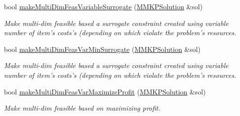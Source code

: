 \begin{DoxyCompactItemize}
bool \hyperlink{class_m_m_k_p___meta_heuristic_ab46e7fb53a209807fb2da72c52c08802}{make\+Multi\+Dim\+Feas\+Variable\+Surrogate} (\hyperlink{class_m_m_k_p_solution}{M\+M\+K\+P\+Solution} \&sol)
\begin{DoxyCompactList}\small\item\em Make multi-\/dim feasible based a surrogate constraint created using variable number of item's costs's (depending on which violate the problem's resources. \end{DoxyCompactList}\item 
bool \hyperlink{class_m_m_k_p___meta_heuristic_a0997f043cae182ab38950724e5950661}{make\+Multi\+Dim\+Feas\+Var\+Min\+Surrogate} (\hyperlink{class_m_m_k_p_solution}{M\+M\+K\+P\+Solution} \&sol)
\begin{DoxyCompactList}\small\item\em Make multi-\/dim feasible based a surrogate constraint created using variable number of item's costs's (depending on which violate the problem's resources. \end{DoxyCompactList}\item 
bool \hyperlink{class_m_m_k_p___meta_heuristic_a941d76e21887d3c4d98f37bace9d61e5}{make\+Multi\+Dim\+Feas\+Var\+Maximize\+Profit} (\hyperlink{class_m_m_k_p_solution}{M\+M\+K\+P\+Solution} \&sol)
\begin{DoxyCompactList}\small\item\em Make multi-\/dim feasible based on maximizing profit. \end{DoxyCompactList}\end{DoxyCompactItemize}
